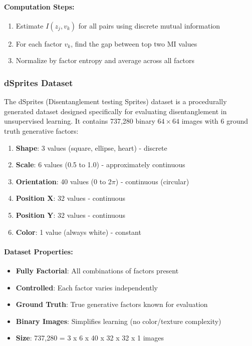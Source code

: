 \documentclass[conference]{IEEEtran}
\begin{document}
\paragraph{Computation Steps:}
\begin{enumerate}
    \item Estimate $I(z_j, v_k)$ for all pairs using discrete mutual information
    \item For each factor $v_k$, find the gap between top two MI values
    \item Normalize by factor entropy and average across all factors
\end{enumerate}

\subsubsection{dSprites Dataset}

The dSprites (Disentanglement testing Sprites) dataset is a procedurally generated dataset designed specifically for evaluating disentanglement in unsupervised learning. It contains 737,280 binary $64 \times 64$ images with 6 ground truth generative factors:

\begin{enumerate}
    \item \textbf{Shape}: 3 values (square, ellipse, heart) - discrete
    \item \textbf{Scale}: 6 values (0.5 to 1.0) - approximately continuous
    \item \textbf{Orientation}: 40 values (0 to 2$\pi$) - continuous (circular)
    \item \textbf{Position X}: 32 values - continuous
    \item \textbf{Position Y}: 32 values - continuous
    \item \textbf{Color}: 1 value (always white) - constant
\end{enumerate}

\paragraph{Dataset Properties:}
\begin{itemize}
    \item \textbf{Fully Factorial}: All combinations of factors present
    \item \textbf{Controlled}: Each factor varies independently
    \item \textbf{Ground Truth}: True generative factors known for evaluation
    \item \textbf{Binary Images}: Simplifies learning (no color/texture complexity)
    \item \textbf{Size}: 737,280 = 3 x 6 x 40 x 32 x 32 x 1 images
\end{itemize}
\end{document}
